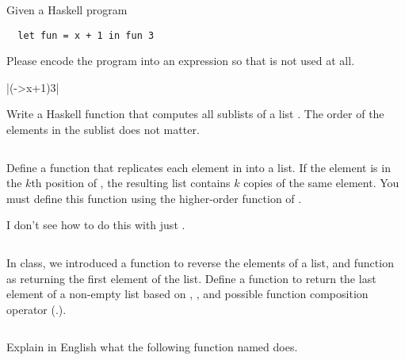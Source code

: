 \documentclass[12pt,letterpaper,twoside]{hmcpset}
\begin{document}
\begin{problem}[1]
 Given a Haskell program
 \begin{verbatim}
  let fun = x + 1 in fun 3
 \end{verbatim}
Please encode the program into an expression so that  is not used at all.
\end{problem}

\begin{solution}
 |(\x->x+1)3|
\end{solution}

\begin{problem}[2]
 Write a Haskell function  that computes all sublists of a list . The order of the elements in the sublist does not matter.
\end{problem}

\begin{solution}
\inputminted{haskell}{code/sublists.hs}
\end{solution}

\begin{problem}[3]
 Define a function  that replicates each element in  into a list. If the element is in the $k$th position of , the resulting list contains $k$ copies of the same element. You must define this function using the higher-order function of .
\end{problem}

\begin{solution}
 I don't see how to do this with just .
 \inputminted{haskell}{code/replic.hs}
\end{solution}

\begin{problem}[4]
 In class, we introduced a function  to reverse the elements of a list, and function  as returning the first element of the list.  Define a function  to return the last element of a non-empty list based on , , and possible function composition operator (.).
\end{problem}

\begin{solution}
 \inputminted{haskell}{code/laste.hs}
\end{solution}

\begin{problem}[5]
 Explain in English what the following function named  does.
  \inputminted{haskell}{code/mystery.hs}
\end{problem}
\end{document}
